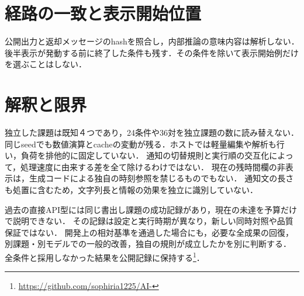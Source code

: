 \documentclass[uplatex,a4paper,twocolumn,10pt]{jsarticle}
\begin{document}
\section{経路の一致と表示開始位置}

公開出力と返却メッセージのhashを照合し，内部推論の意味内容は解析しない．
後半表示が発動する前に終了した条件も残す．その条件を除いて表示開始例だけを選ぶことはしない．

\section{解釈と限界}
独立した課題は既知４つであり，24条件や36対を独立課題の数に読み替えない．
同じseedでも数値演算とcacheの変動が残る．ホストでは軽量編集や解析も行い，負荷を排他的に固定していない．
通知の切替規則と実行順の交互化によって，処理速度に由来する差を全て除けるわけではない．
現在の残時間欄の非表示は，生成コードによる独自の時刻参照を禁じるものでもない．
通知文の長さも処置に含むため，文字列長と情報の効果を独立に識別していない．

過去の直接API型には同じ書出し課題の成功記録があり，現在の未達を予算だけで説明できない．
その記録は設定と実行時期が異なり，新しい同時対照や品質保証ではない．
開発上の相対基準を通過した場合にも，必要な全成果の回復，別課題・別モデルでの一般的改善，独自の規則が成立したかを別に判断する．
全条件と採用しなかった結果を公開記録に保持する\footnote{\url{https://github.com/sophiria1225/AI-}}．
\end{document}

